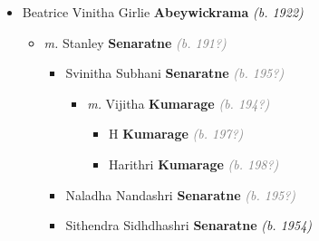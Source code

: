 \documentclass[10pt, openany]{book}
\begin{document}
\begin{itemize}
{\begin{itemize}
{\begin{itemize}
{\begin{itemize}
{\begin{itemize}
{\begin{itemize}
{\begin{itemize}
{\begin{itemize}
\item{Aristides Haren \textbf{Abeywickrama} \textcolor{slorange}{\textit{(b. 1989)}} \textcolor{slmaroon}{\textit{Software Developer (\footnote{\url{https://lu.linkedin.com/in/aristides-abeywickrama-56181370}}).}}
  }
\item{Lilani Anastasia \textbf{Abeywickrama} \textcolor{slorange}{\textit{(b. 1986)}} \textcolor{slmaroon}{\textit{Physician.
UCL, Masters (Biology) (2011 - 2012).
University of Nottingham, Bachelor of Medicine (Medicine) (2004 - 2009).}}
  }
\end{itemize}}
\end{itemize}
  }
\end{itemize}}
\end{itemize}
  }
\item{Beatrice Vinitha Girlie \textbf{Abeywickrama} \textcolor{slorange}{\textit{(b. 1922)}}
\begin{itemize}
\item{\textit{m.} Stanley \textbf{Senaratne} \textcolor{gray}{\textit{(b. 191?)}}   \label{couple:00000019:00000810} \begin{itemize}
\item{Svinitha Subhani \textbf{Senaratne} \textcolor{gray}{\textit{(b. 195?)}}
\begin{itemize}
\item{\textit{m.} Vijitha \textbf{Kumarage} \textcolor{gray}{\textit{(b. 194?)}}   \label{couple:00000494:00000811} \begin{itemize}
\item{H \textbf{Kumarage} \textcolor{gray}{\textit{(b. 197?)}}
 }
\item{Harithri \textbf{Kumarage} \textcolor{gray}{\textit{(b. 198?)}}
 }
\end{itemize}}
\end{itemize}
  }
\item{Naladha Nandashri \textbf{Senaratne} \textcolor{gray}{\textit{(b. 195?)}}
  }
\item{Sithendra Sidhdhashri \textbf{Senaratne} \textcolor{slorange}{\textit{(b. 1954)}}
\begin{itemize}

\end{itemize}}
\end{itemize}}
\end{itemize}}
\end{itemize}}
\end{itemize}}
\end{itemize}}
\end{itemize}
\end{document}
